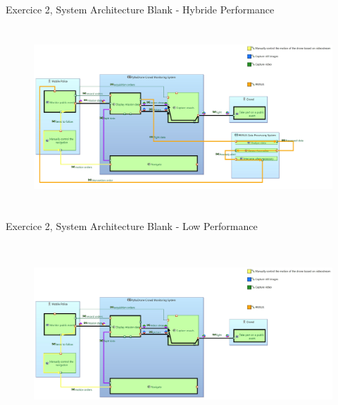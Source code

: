 \documentclass[aspectratio=1610]{beamer}
\begin{document}
    \begin{frame}{Exercice 2, System Architecture Blank - Hybride Performance}
        \begin{figure}[H]
            \centering
            \includegraphics[width=\textwidth, height=6.75cm, keepaspectratio]{./images/EX2/CSC_5RO08_TA_EX2_SAB_Hybride.jpg}
        \end{figure}
    \end{frame}
    \begin{frame}{Exercice 2, System Architecture Blank - Low Performance}
        \begin{figure}[H]
            \centering
            \includegraphics[width=\textwidth, height=6.75cm, keepaspectratio]{./images/EX2/CSC_5RO08_TA_EX2_SAB_Low.jpg}
        \end{figure}
    \end{frame}
\end{document}
